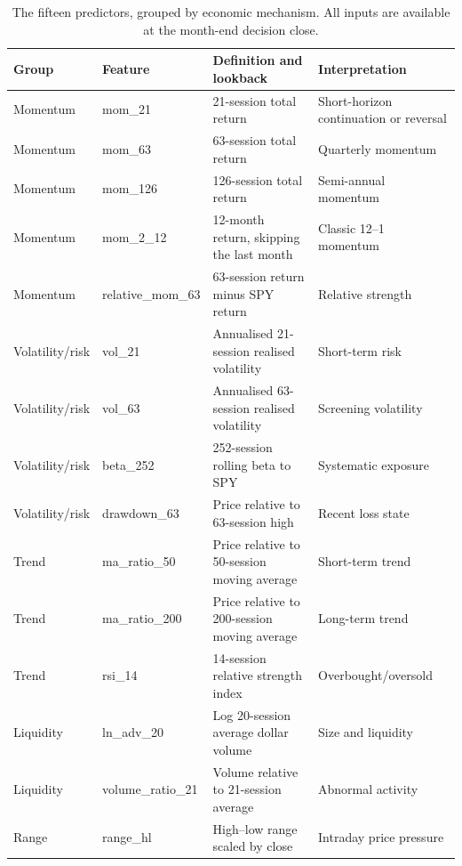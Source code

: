 \begin{table}[H]
\centering
\footnotesize
\begin{tabular}{p{2.1cm}p{2.8cm}p{5.3cm}p{3.9cm}}
\toprule
Group & Feature & Definition and lookback & Interpretation \\
\midrule
Momentum & mom\_21 & 21-session total return & Short-horizon continuation or reversal \\
Momentum & mom\_63 & 63-session total return & Quarterly momentum \\
Momentum & mom\_126 & 126-session total return & Semi-annual momentum \\
Momentum & mom\_2\_12 & 12-month return, skipping the last month & Classic 12--1 momentum \\
Momentum & relative\_mom\_63 & 63-session return minus SPY return & Relative strength \\
Volatility/risk & vol\_21 & Annualised 21-session realised volatility & Short-term risk \\
Volatility/risk & vol\_63 & Annualised 63-session realised volatility & Screening volatility \\
Volatility/risk & beta\_252 & 252-session rolling beta to SPY & Systematic exposure \\
Volatility/risk & drawdown\_63 & Price relative to 63-session high & Recent loss state \\
Trend & ma\_ratio\_50 & Price relative to 50-session moving average & Short-term trend \\
Trend & ma\_ratio\_200 & Price relative to 200-session moving average & Long-term trend \\
Trend & rsi\_14 & 14-session relative strength index & Overbought/oversold \\
Liquidity & ln\_adv\_20 & Log 20-session average dollar volume & Size and liquidity \\
Liquidity & volume\_ratio\_21 & Volume relative to 21-session average & Abnormal activity \\
Range & range\_hl & High--low range scaled by close & Intraday price pressure \\
\bottomrule
\end{tabular}
\caption{The fifteen predictors, grouped by economic mechanism. All inputs are available at the month-end decision close.}
\label{tab:features}
\end{table}
